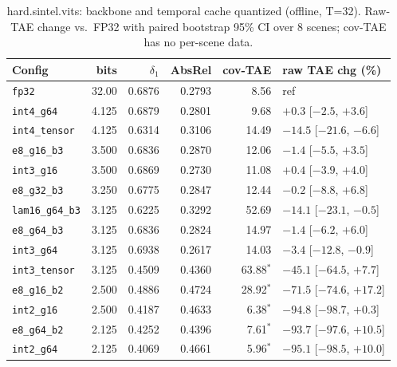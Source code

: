 \begin{table}[t]
\centering
\small
\caption{hard.sintel.vits: backbone and temporal cache quantized (offline, T=32). Raw-TAE change vs.\ FP32 with paired bootstrap 95\% CI over 8 scenes; cov-TAE has no per-scene data.}
\label{tab:boot_hard_sintel_vits}
\begin{tabular}{lrrrrl}
\toprule
Config & bits & $\delta_1$ & AbsRel & cov-TAE & raw TAE chg (\%) \\
\midrule
\texttt{fp32} & 32.00 & 0.6876 & 0.2793 & 8.56 & ref \\
\texttt{int4\_g64} & 4.125 & 0.6879 & 0.2801 & 9.68 & $+0.3$ [$-2.5$, $+3.6$] \\
\texttt{int4\_tensor} & 4.125 & 0.6314 & 0.3106 & 14.49 & $-14.5$ [$-21.6$, $-6.6$] \\
\texttt{e8\_g16\_b3} & 3.500 & 0.6836 & 0.2870 & 12.06 & $-1.4$ [$-5.5$, $+3.5$] \\
\texttt{int3\_g16} & 3.500 & 0.6869 & 0.2730 & 11.08 & $+0.4$ [$-3.9$, $+4.0$] \\
\texttt{e8\_g32\_b3} & 3.250 & 0.6775 & 0.2847 & 12.44 & $-0.2$ [$-8.8$, $+6.8$] \\
\texttt{lam16\_g64\_b3} & 3.125 & 0.6225 & 0.3292 & 52.69 & $-14.1$ [$-23.1$, $-0.5$] \\
\texttt{e8\_g64\_b3} & 3.125 & 0.6836 & 0.2824 & 14.97 & $-1.4$ [$-6.2$, $+6.0$] \\
\texttt{int3\_g64} & 3.125 & 0.6938 & 0.2617 & 14.03 & $-3.4$ [$-12.8$, $-0.9$] \\
\texttt{int3\_tensor} & 3.125 & 0.4509 & 0.4360 & 63.88$^\ast$ & $-45.1$ [$-64.5$, $+7.7$] \\
\texttt{e8\_g16\_b2} & 2.500 & 0.4886 & 0.4724 & 28.92$^\ast$ & $-71.5$ [$-74.6$, $+17.2$] \\
\texttt{int2\_g16} & 2.500 & 0.4187 & 0.4633 & 6.38$^\ast$ & $-94.8$ [$-98.7$, $+0.3$] \\
\texttt{e8\_g64\_b2} & 2.125 & 0.4252 & 0.4396 & 7.61$^\ast$ & $-93.7$ [$-97.6$, $+10.5$] \\
\texttt{int2\_g64} & 2.125 & 0.4069 & 0.4661 & 5.96$^\ast$ & $-95.1$ [$-98.5$, $+10.0$] \\
\bottomrule
\end{tabular}
\end{table}
